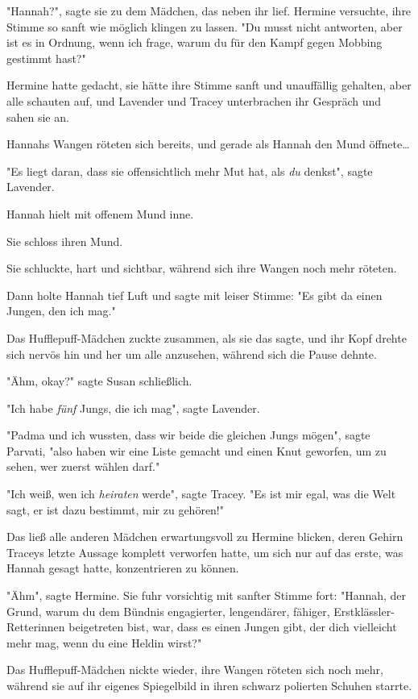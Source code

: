 {"Hannah?", sagte sie zu dem Mädchen, das neben ihr lief. Hermine versuchte, ihre Stimme so sanft wie möglich klingen zu lassen. "Du musst nicht antworten, aber ist es in Ordnung, wenn ich frage, warum du für den Kampf gegen Mobbing gestimmt hast?"

Hermine hatte gedacht, sie hätte ihre Stimme sanft und unauffällig gehalten, aber alle schauten auf, und Lavender und Tracey unterbrachen ihr Gespräch und sahen sie an.

Hannahs Wangen röteten sich bereits, und gerade als Hannah den Mund öffnete…

"Es liegt daran, dass sie offensichtlich mehr Mut hat, als \emph{du} denkst", sagte Lavender.

Hannah hielt mit offenem Mund inne.

Sie schloss ihren Mund.

Sie schluckte, hart und sichtbar, während sich ihre Wangen noch mehr röteten.

Dann holte Hannah tief Luft und sagte mit leiser Stimme: "Es gibt da einen Jungen, den ich mag."

Das Hufflepuff-Mädchen zuckte zusammen, als sie das sagte, und ihr Kopf drehte sich nervös hin und her um alle anzusehen, während sich die Pause dehnte.

"Ähm, okay?" sagte Susan schließlich.

"Ich habe \emph{fünf} Jungs, die ich mag", sagte Lavender.

"Padma und ich wussten, dass wir beide die gleichen Jungs mögen", sagte Parvati, "also haben wir eine Liste gemacht und einen Knut geworfen, um zu sehen, wer zuerst wählen darf."

"Ich weiß, wen ich \emph{heiraten} werde", sagte Tracey. "Es ist mir egal, was die Welt sagt, er ist dazu bestimmt, mir zu gehören!"

Das ließ alle anderen Mädchen erwartungsvoll zu Hermine blicken, deren Gehirn Traceys letzte Aussage komplett verworfen hatte, um sich nur auf das erste, was Hannah gesagt hatte, konzentrieren zu können.

"Ähm", sagte Hermine. Sie fuhr vorsichtig mit sanfter Stimme fort: "Hannah, der Grund, warum du dem Bündnis engagierter, lengendärer, fähiger, Erstklässler-Retterinnen beigetreten bist, war, dass es einen Jungen gibt, der dich vielleicht mehr mag, wenn du eine Heldin wirst?"

Das Hufflepuff-Mädchen nickte wieder, ihre Wangen röteten sich noch mehr, während sie auf ihr eigenes Spiegelbild in ihren schwarz polierten Schuhen starrte.

}

